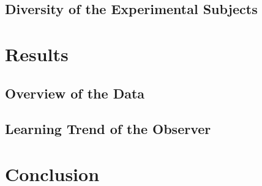 \documentclass[10pt]{article}
\begin{document}
\subsection{Diversity of the Experimental Subjects}

\section{Results}
\subsection{Overview of the Data}
\subsection{Learning Trend of the Observer}

\section{Conclusion}




\end{document}
